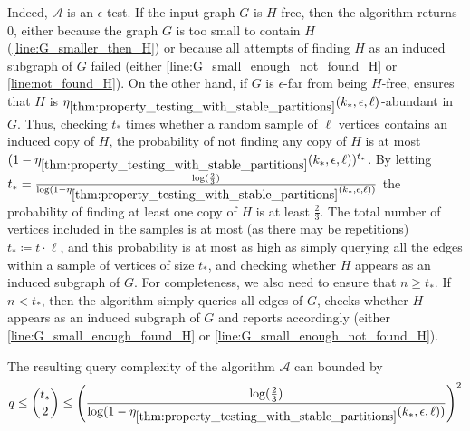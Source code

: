         Indeed, $\mathcal{A}$ is an $\epsilon$-test.
        If the input graph $G$ is $H$-free, then the algorithm returns $0$, either because the graph $G$ is too small to
        contain $H$ (\cref{line:G_smaller_then_H}) or because all attempts of finding $H$ as an induced subgraph of $G$
        failed (either \cref{line:G_small_enough_not_found_H} or \cref{line:not_found_H}).
        On the other hand, if $G$ is $\epsilon$-far from being $H$-free, 
        ensures that $H$ is $\eta_{\ref{thm:property_testing_with_stable_partitions}}(k_*, \epsilon, \ell)$-abundant in $G$.
        Thus, checking $t_*$ times whether a random sample of $\ell$ vertices contains an
        induced copy of $H$, the probability of not finding any copy of $H$ is at most
        $( 1 - \eta_{\ref{thm:property_testing_with_stable_partitions}}(k_*, \epsilon, \ell) )^{t_*}$.
        By letting $t_* = \frac{\log( \frac{2}{3} )}
            {\log( 1 - \eta_{\ref{thm:property_testing_with_stable_partitions}}(k_*, \epsilon, \ell) )}$
        the probability of finding at least one copy of $H$ is at least $\frac{2}{3}$.
        The total number of vertices included in the samples is at most (as there may be repetitions) $t_* \coloneqq t \cdot \ell$,
        and this probability is at most as high as simply querying all the edges within a sample of vertices of size
        $t_*$, and checking whether $H$ appears as an induced subgraph of $G$.
        For completeness, we also need to ensure that $n \geq t_*$.
        If $n < t_*$, then the algorithm simply queries all edges of $G$, checks whether $H$ appears as an induced subgraph
        of $G$ and reports accordingly (either \cref{line:G_small_enough_found_H} or \cref{line:G_small_enough_not_found_H}).

        The resulting query complexity of the algorithm $\mathcal{A}$ can bounded by
        \[
            q \leq {t_* \choose 2}
              \leq \left(  \frac{\log( \frac{2}{3} )}
                   {\log( 1 - \eta_{\ref{thm:property_testing_with_stable_partitions}}(k_*, \epsilon, \ell) )} \right)^2
        \]


